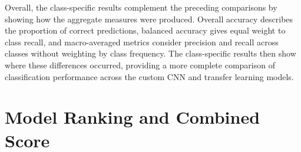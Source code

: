\documentclass[12pt, a4paper]{report}
\let\oldsection\section
\renewcommand{\section}{%
    \Needspace{6\baselineskip}%
    \oldsection
}
\begin{document}
				Overall, the class-specific results complement the preceding comparisons by showing how the aggregate measures were produced. Overall accuracy describes the proportion of correct predictions, balanced accuracy gives equal weight to class recall, and macro-averaged metrics consider precision and recall across classes without weighting by class frequency. The class-specific results then show where these differences occurred, providing a more complete comparison of classification performance across the custom CNN and transfer learning models.
				
		\section{Model Ranking and Combined Score}
		\label{sec:model_ranking_and_combined_score}
			
\end{document}
